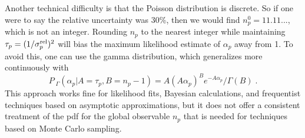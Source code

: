 \documentclass{cernrep}
\newcommand{\PGamma}{{\ensuremath{P_{\;\Gamma}}}}
\begin{document}
Another technical difficulty is that the Poisson distribution is discrete. So if one were to say the relative uncertainty was 30\%, then we would find $n_p^0=11.11...$, which is not an integer.  Rounding $n_p$ to the nearest integer while maintaining $\tau_p= (1/\sigma_{p}^{\rm rel})^2$ will bias the maximum likelihood estimate of $\alpha_p$ away from 1.  To avoid this, one can use the gamma distribution, which generalizes more continuously with 
\begin{equation}
\PGamma(\alpha_p | A=\tau_p, B=n_p-1) = A (A \alpha_p)^{B} e^{-A \alpha_p} / \Gamma(B)\;.
\end{equation}
This approach works fine for likelihood fits, Bayesian calculations, and frequentist techniques based on asymptotic approximations, but it does not offer a consistent treatment of the pdf for the global observable $n_p$ that is needed for techniques based on Monte Carlo sampling. 


\end{document}
